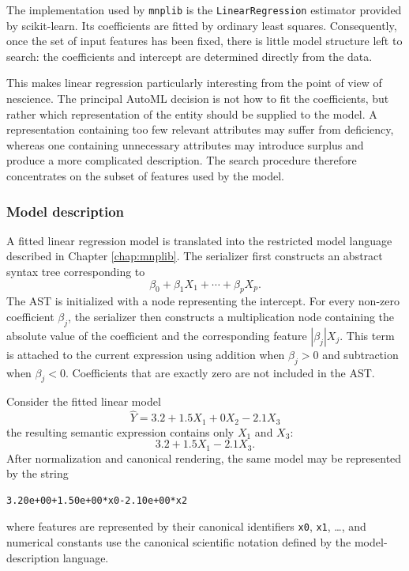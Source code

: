 The implementation used by \texttt{mnplib} is the \texttt{LinearRegression} estimator provided by scikit-learn. Its coefficients are fitted by ordinary least squares. Consequently, once the set of input features has been fixed, there is little model structure left to search: the coefficients and intercept are determined directly from the data.

This makes linear regression particularly interesting from the point of view of nescience. The principal AutoML decision is not how to fit the coefficients, but rather which representation of the entity should be supplied to the model. A representation containing too few relevant attributes may suffer from deficiency, whereas one containing unnecessary attributes may introduce surplus and produce a more complicated description. The search procedure therefore concentrates on the subset of features used by the model.

\subsubsection{Model description}

A fitted linear regression model is translated into the restricted model language described in Chapter \ref{chap:mnplib}. The serializer first constructs an abstract syntax tree corresponding to
\[
\beta_0 + \beta_1 X_1 + \cdots + \beta_p X_p.
\]
The AST is initialized with a node representing the intercept. For every non-zero coefficient \(\beta_j\), the serializer then constructs a multiplication node containing the absolute value of the coefficient and the
corresponding feature $|\beta_j| X_j$. This term is attached to the current expression using addition when
\(\beta_j>0\) and subtraction when \(\beta_j<0\). Coefficients that are exactly zero are not included in the AST.

\begin{example}
Consider the fitted linear model
\[
\widehat{Y} = 3.2 + 1.5X_1 + 0X_2 - 2.1X_3
\]
the resulting semantic expression contains only $X_1$ and $X_3$:
\[
3.2+1.5X_1-2.1X_3.
\]
After normalization and canonical rendering, the same model may be represented by the string
\begin{verbatim}
3.20e+00+1.50e+00*x0-2.10e+00*x2
\end{verbatim}
where features are represented by their canonical identifiers \texttt{x0}, \texttt{x1}, \ldots, and numerical constants use the canonical scientific notation defined by the model-description language.
\end{example}

